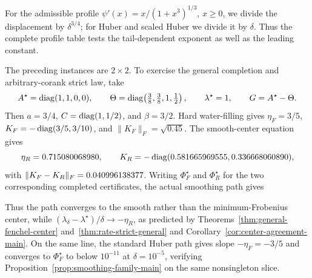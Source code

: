 For the admissible profile \(\psi'(x)=x/(1+x^3)^{1/3}\), \(x\ge0\),
we divide the displacement by \(\delta^{3/4}\); for Huber and scaled
Huber we divide it by \(\delta\).  Thus the complete profile table tests
the tail-dependent exponent as well as the leading constant.


The preceding instances are \(2\times2\).  To exercise the general
completion and arbitrary-corank strict law, take
\[
 A^\star=\operatorname{diag}(1,1,0,0),\qquad
 \Theta=\operatorname{diag}\!\left(\tfrac38,\tfrac38,1,\tfrac12\right),\qquad
 \lambda^\star=1,\qquad G=A^\star-\Theta.
\]
Then \(a=3/4\), \(C=\operatorname{diag}(1,1/2)\), and \(\beta=3/2\).  Hard
water-filling gives
\(\eta_F=3/5\),
\(K_F=-\operatorname{diag}(3/5,3/10)\), and
\(\|K_F\|_F=\sqrt{0.45}\).  The smooth-center equation gives
\[
 \eta_R=0.715080068980,\qquad
 K_R=-\operatorname{diag}(0.581665969555,0.336668060890),
\]
with \(\|K_F-K_R\|_F=0.040996138377\).  Writing
\(\Phi_F^\star\) and \(\Phi_R^\star\) for the two corresponding completed
certificates, the actual smoothing path gives

Thus the path converges to the smooth rather than the minimum-Frobenius
center, while
\((\lambda_\delta-\lambda^\star)/\delta\to-\eta_R\), as predicted by
Theorems~\ref{thm:general-fenchel-center} and~\ref{thm:rate-strict-general}
and Corollary~\ref{cor:center-agreement-main}.
On the same line, the standard Huber path gives slope
\(-\eta_F=-3/5\) and converges to \(\Phi_F^\star\) to below
\(10^{-11}\) at \(\delta=10^{-5}\), verifying
Proposition~\ref{prop:smoothing-family-main} on the same nonsingleton slice.

